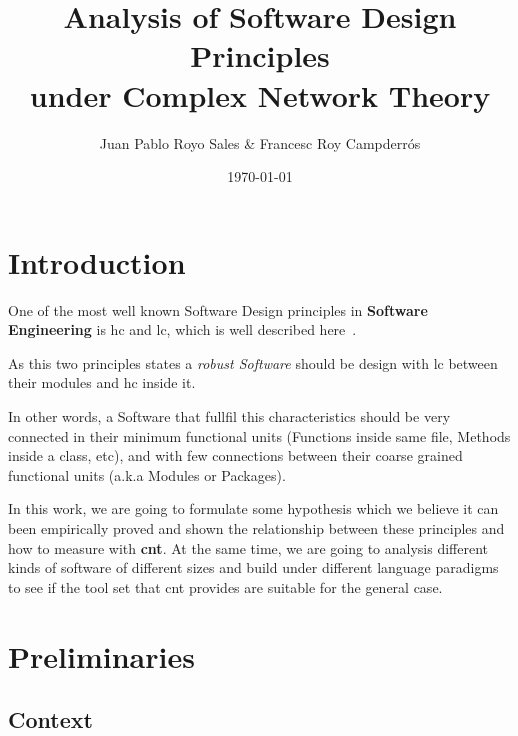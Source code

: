 \documentclass[12pt, a4paper]{article}
\title{%
      Analysis of Software Design Principles \\
      under Complex Network Theory\\
}
\author{Juan Pablo Royo Sales \& Francesc Roy Campderrós}
\affil{Universitat Politècnica de Catalunya}
\date\today
\begin{document}
\maketitle

\tableofcontents

\section{Introduction}
One of the most well known Software Design principles in \textbf{Software Engineering} is \acrfull{hc} and \acrfull{lc}, which is well described here~\cite{cohesion_coupling}.

As this two principles states a \textit{robust Software} should be design with \acrlong{lc} between their modules and \acrlong{hc} inside it. 

In other words, a Software that fullfil this characteristics should be very connected in their minimum functional units (Functions inside same file, Methods inside a class, etc), and with few connections between their coarse grained functional units (a.k.a Modules or Packages).

In this work, we are going to formulate some hypothesis which we believe it can been empirically proved and shown the relationship between these principles and how to measure with \textbf{\acrfull{cnt}}.
At the same time, we are going to analysis different kinds of software of different sizes and build under different language paradigms to see if the tool set that \acrshort{cnt} provides are suitable for the general case. 

\section{Preliminaries}
\subsection{Context}
\end{document}
